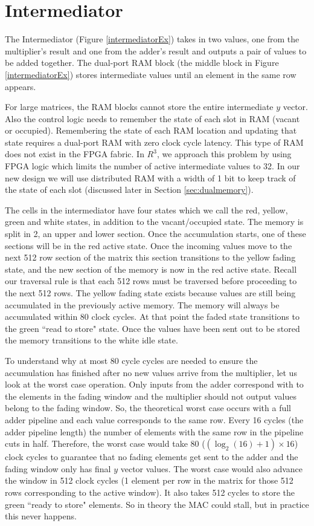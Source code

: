\section{Intermediator}
\label{sec:intermediator}
The Intermediator (Figure \ref{intermediatorEx}) takes in two values, one from the multiplier's result and one from the adder's result and outputs a pair of values to be added together. The dual-port RAM block (the middle block in Figure \ref{intermediatorEx}) stores intermediate values until an element in the same row appears. \par
For large matrices, the RAM blocks cannot store the entire intermediate $y$ vector. Also the control logic needs to remember the state of each slot in RAM (vacant or occupied). Remembering the state of each RAM location and updating that state requires a dual-port RAM with zero clock cycle latency. This type of RAM does not exist in the FPGA fabric. In $R^3$, we approach this problem by using FPGA logic which limits the number of active intermediate values to 32. In our new design we will use distributed RAM with a width of 1 bit to keep track of the state of each slot (discussed later in Section \ref{sec:dualmemory}). \par
The cells in the intermediator have four states which we call the red, yellow, green and white states, in addition to the vacant/occupied state. The memory is split in 2, an upper and lower section. Once the accumulation starts, one of these sections will be in the red active state. Once the incoming values move to the next 512 row section of the matrix this section transitions to the yellow fading state, and the new section of the memory is now in the red active state. Recall our traversal rule is that each 512 rows must be traversed before proceeding to the next 512 rows. The yellow fading state exists because values are still being accumulated in the previously active memory. The memory will always be accumulated within 80 clock cycles. At that point the faded state transitions to the green ``read to store" state. Once the values have been sent out to be stored the memory transitions to the white idle state.
\par To understand why at most 80 cycle cycles are needed to ensure the accumulation has finished after no new values arrive from the multiplier, let us look at the worst case operation. Only inputs from the adder correspond with to the elements in the fading window and the multiplier should not output values belong to the fading window. So, the theoretical worst case occurs with a full adder pipeline and each value corresponds to the same row. Every 16 cycles (the adder pipeline length) the number of elements with the same row in the pipeline cuts in half. Therefore, the worst case would take 80 ($(\log_2(16) + 1) \times 16$) clock cycles to guarantee that no fading elements get sent to the adder and the fading window only has final $y$ vector values. The worst case would also advance the window in 512 clock cycles (1 element per row in the matrix for those 512 rows corresponding to the active window). It also takes 512 cycles to store the green ``ready to store" elements. So in theory the MAC could stall, but in practice this never happens.
